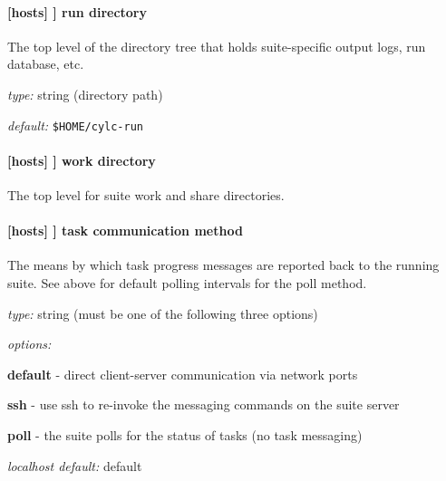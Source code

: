 \paragraph[run directory]{[hosts] \textrightarrow [[HOST]] \textrightarrow run directory }

The top level of the directory tree that holds suite-specific output logs,
run database, etc.

\begin{myitemize}
\item {\em type:} string (directory path)
\item {\em default:} \lstinline=$HOME/cylc-run=
\end{myitemize}

\paragraph[work directory]{[hosts] \textrightarrow [[HOST]] \textrightarrow work directory }
\label{workdirectory}

The top level for suite work and share directories.



\paragraph[task communication method]{[hosts] \textrightarrow [[HOST]] \textrightarrow task communication method }
\label{task_comms_method}

The means by which task progress messages are reported back to the running suite.
See above for default polling intervals for the poll method.

\begin{myitemize}
\item {\em type:} string (must be one of the following three options)
\item {\em options:}
    \begin{myitemize}
    \item {\bf default} - direct client-server communication via network ports
    \item {\bf ssh} - use ssh to re-invoke the messaging commands on the suite server
    \item {\bf poll} - the suite polls for the status of tasks (no task messaging)
  \end{myitemize}
\item {\em localhost default:} default
\end{myitemize}

